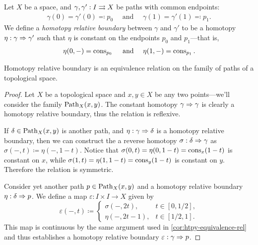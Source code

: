 \begin{definition}
    \label{def:htpy-relative-boundary}
    Let \(X\) be a space, and \(\gamma, \gamma': I \rightrightarrows X\) be paths with common
    endpoints:
    \begin{align*}
        \gamma(0) = \gamma'(0) \eqqcolon p_0\quad \text{ and }\quad
        \gamma(1) = \gamma'(1) \eqqcolon p_1.
    \end{align*}
    We define a \emph{homotopy relative boundary} between \(\gamma\) and \(\gamma'\)
    to be a homotopy \(\eta: \gamma \Rightarrow \gamma'\) such that \(\eta\) is constant on
    the endpoints \(p_0\) and \(p_1\)---that is,
    \begin{align*}
        \eta(0, -) = \operatorname{cons}_{p_0}\quad \text{ and }\quad \eta(1, -) = \operatorname{cons}_{p_1}.
    \end{align*}
\end{definition}

\begin{proposition}
    \label{prop:htpy-rel-boundary-is-equiv-relation}
    Homotopy relative boundary is an equivalence relation on the family of paths of
    a topological space.
\end{proposition}

\begin{proof}
    Let \(X\) be a topological space and \(x, y \in X\) be any two points---we'll
    consider the family
    \(\operatorname{Path}_X(x, y)\). The constant homotopy \(\gamma \Rightarrow \gamma\) is clearly a homotopy relative boundary, thus the relation is reflexive.

    If \(\delta \in \operatorname{Path}_X(x, y)\) is another path, and \(\eta: \gamma \Rightarrow
    \delta\) is a homotopy relative boundary, then we can construct the a reverse
    homotopy \(\sigma: \delta \Rightarrow \gamma\) as \(\sigma(-, t) \coloneq \eta(-, 1 -
    t)\). Notice that \(\sigma(0, t) = \eta(0, 1 - t) = \operatorname{cons}_x(1 - t)\) is
    constant on \(x\), while \(\sigma(1, t) = \eta(1, 1 - t) = \operatorname{cons}_y(1 - t)\) is
    constant on \(y\). Therefore the relation is symmetric.

    Consider yet another path \(p \in
    \operatorname{Path}_X(x, y)\) and a homotopy relative boundary \(\eta: \delta \Rightarrow p\). We
    define a map \(\varepsilon: I \times I \to X\) given by
    \[
        \varepsilon(-, t) \coloneq
        \begin{cases}
            \sigma(-, 2t),    & t \in [0, 1/2], \\
            \eta(-, 2 t - 1), & t \in [1/2, 1].
        \end{cases}
    \]
    This map is continuous by the same argument used in
    \cref{cor:htpy-equivalence-rel} and thus establishes a homotopy relative boundary
    \(\varepsilon: \gamma \Rightarrow p\).
\end{proof}

